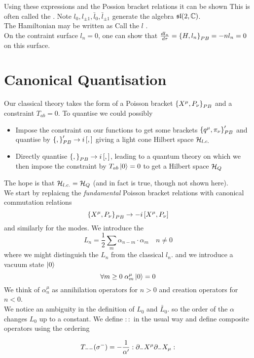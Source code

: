 \documentclass{article}
\begin{document}
Using these expressions and the Possion bracket relations it can be shown 
This is often called the . Note $l_0, l_{\pm1},\bar{l}_0,\bar{l}_{\pm1}$ generate the algebra $\mf{sl}(2,\mbb{C})$. \\
The Hamiltonian may be written as  
Call the $l$ . \\

On the contraint surface $l_n=0$, one can show that $\frac{dl_n}{d\tau}=\pb[H]{l_n}=-nl_n = 0$ on this surface.


\section{Canonical Quantisation}

Our classical theory takes the form of a Poisson bracket $\pb[X^\mu]{P_\nu}$ and a constraint $T_{ab}=0$. To quantise we could possibly 
\begin{itemize}
    \item Impose the constraint on our functions to get some brackets $\pb[q^\mu]{\pi_\nu}^\prime$ and quantise by $\pb[ ]{ }^\prime \to i\comm[ ]{ }$ giving a light cone Hilbert space $\mc{H}_{l.c.}$
    \item Directly quantise $\pb[ ]{ } \to i\comm[ ]{ }$, leading to a quantum theory on which we then impose the constraint by $T_{ab}\ket{0}=0$ to get a Hilbert space $\mc{H}_Q$
\end{itemize}
The hope is that $\mc{H}_{l.c.} = \mc{H}_Q$ (and in fact is true, though not shown here). \\
We start by replaicng the \emph{fundamental} Poisson bracket relations with canonical commutation relations 
\[
\pb[X^\mu]{P_\nu} \to -i\comm[X^\mu]{P_\nu}
\]
and similarly for the modes. We introduce the  
\[
L_n = \frac{1}{2} \sum_m \alpha_{n-m} \cdot \alpha_m \quad n\neq 0
\]
where we might distinguish the $L_n$ from the classical $l_n$. and we introduce a vacuum state $\ket{0}$
\[
\forall m\geq0 \; \alpha^\mu_m \ket{0} = 0 
\]
We think of $\alpha^\mu_n$ as annihilation operators for $n>0$ and creation operators for $n<0$. \\
We notice an ambiguity in the definition of $L_0$ and $\bar{L}_0$. 
so the order of the $\alpha$ changes $L_0$ up to a constant. We define  $::$ in the usual way and define composite operators using the ordering 
\begin{example}
\[
T_{--}(\sigma^-) = -\frac{1}{\cst} : \del_- X^\mu \del_- X_\mu :
\]
\end{example}
\end{document}
